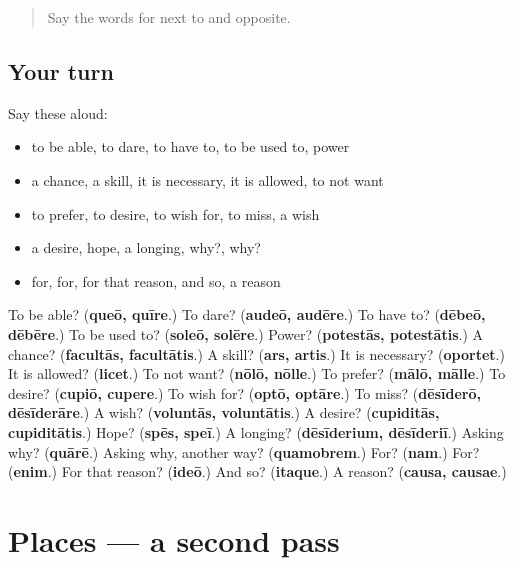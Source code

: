 \label{lesson:LA-R119-first-pass-can-want-and-why}



\begin{quote}
Say the words for next to and opposite.
\end{quote}

\subsection*{Your turn}
Say these aloud:

\begin{itemize}
\raggedright
  \item to be able, to dare, to have to, to be used to, power
  \item a chance, a skill, it is necessary, it is allowed, to not want
  \item to prefer, to desire, to wish for, to miss, a wish
  \item a desire, hope, a longing, why?, why?
  \item for, for, for that reason, and so, a reason
\end{itemize}

\begin{tcolorbox}[breakable,colback=teal!4,colframe=teal!35!black,title={Before you move on}]
To be able? (\textbf{queō, quīre}.) To dare? (\textbf{audeō, audēre}.) To have to? (\textbf{dēbeō, dēbēre}.) To be used to? (\textbf{soleō, solēre}.) Power? (\textbf{potestās, potestātis}.) A chance? (\textbf{facultās, facultātis}.) A skill? (\textbf{ars, artis}.) It is necessary? (\textbf{oportet}.) It is allowed? (\textbf{licet}.) To not want? (\textbf{nōlō, nōlle}.) To prefer? (\textbf{mālō, mālle}.) To desire? (\textbf{cupiō, cupere}.) To wish for? (\textbf{optō, optāre}.) To miss? (\textbf{dēsīderō, dēsīderāre}.) A wish? (\textbf{voluntās, voluntātis}.) A desire? (\textbf{cupiditās, cupiditātis}.) Hope? (\textbf{spēs, speī}.) A longing? (\textbf{dēsīderium, dēsīderiī}.) Asking why? (\textbf{quārē}.) Asking why, another way? (\textbf{quamobrem}.) For? (\textbf{nam}.) For? (\textbf{enim}.) For that reason? (\textbf{ideō}.) And so? (\textbf{itaque}.) A reason? (\textbf{causa, causae}.)
\end{tcolorbox}
\section[(dialogue)]{Places — a second pass}

\label{lesson:LA-R119-second-pass-places}




